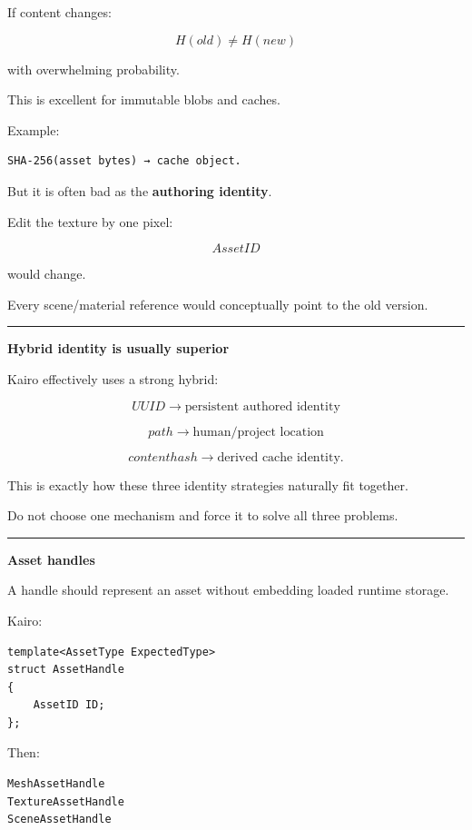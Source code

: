 If content changes:

\[
H(old)\neq H(new)
\]

with overwhelming probability.

This is excellent for immutable blobs and caches.

Example:

\begin{verbatim}
SHA-256(asset bytes) → cache object.
\end{verbatim}

But it is often bad as the \textbf{authoring identity}.

Edit the texture by one pixel:

\[
AssetID
\]

would change.

Every scene/material reference would conceptually point to the old version.

\begin{center}\rule{0.5\linewidth}{0.5pt}\end{center}

\textbf{Hybrid identity is usually superior}

Kairo effectively uses a strong hybrid:

\[
\boxed{
UUID
\rightarrow
\text{persistent authored identity}
}
\]

\[
\boxed{
path
\rightarrow
\text{human/project location}
}
\]

\[
\boxed{
content hash
\rightarrow
\text{derived cache identity}.
}
\]

This is exactly how these three identity strategies naturally fit together.

Do not choose one mechanism and force it to solve all three problems.

\begin{center}\rule{0.5\linewidth}{0.5pt}\end{center}

\textbf{Asset handles}

A handle should represent an asset without embedding loaded runtime storage.

Kairo:

\begin{verbatim}
template<AssetType ExpectedType>
struct AssetHandle
{
    AssetID ID;
};
\end{verbatim}

Then:

\begin{verbatim}
MeshAssetHandle
TextureAssetHandle
SceneAssetHandle
\end{verbatim}


